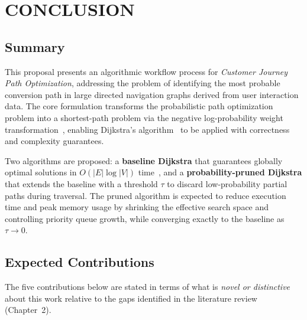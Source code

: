 \chapter{CONCLUSION}

\section{Summary}

This proposal presents an algorithmic workflow process for \textit{Customer Journey Path Optimization}, addressing the problem of identifying the most probable conversion path in large directed navigation graphs derived from user interaction data. The core formulation transforms the probabilistic path optimization problem into a shortest-path problem via the negative log-probability weight transformation~\citep{viterbi1967error,manning2008nlp}, enabling Dijkstra's algorithm~\citep{dijkstra1959} to be applied with correctness and complexity guarantees.

Two algorithms are proposed: a \textbf{baseline Dijkstra} that guarantees globally optimal solutions in $O(|E|\log|V|)$ time~\citep{cormen2009}, and a \textbf{probability-pruned Dijkstra} that extends the baseline with a threshold $\tau$ to discard low-probability partial paths during traversal. The pruned algorithm is expected to reduce execution time and peak memory usage by shrinking the effective search space and controlling priority queue growth, while converging exactly to the baseline as $\tau \to 0$.

\section{Expected Contributions}

The five contributions below are stated in terms of what is \emph{novel or distinctive} about this work relative to the gaps identified in the literature review (Chapter~2).

